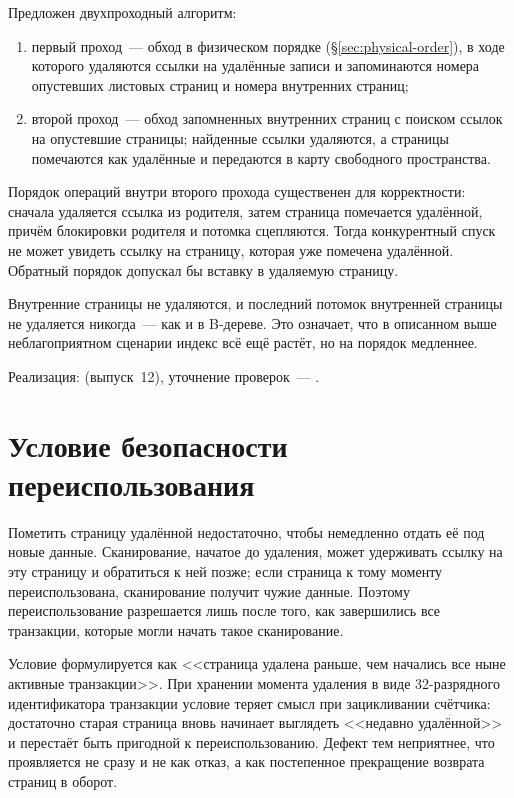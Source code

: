 Предложен двухпроходный алгоритм:

\begin{enumerate}
\item первый проход~--- обход в физическом порядке (§\ref{sec:physical-order}),
      в ходе которого удаляются ссылки на удалённые записи и запоминаются номера
      опустевших листовых страниц и номера внутренних страниц;
\item второй проход~--- обход запомненных внутренних страниц с поиском ссылок
      на опустевшие страницы; найденные ссылки удаляются, а страницы
      помечаются как удалённые и передаются в карту свободного пространства.
\end{enumerate}

Порядок операций внутри второго прохода существенен для корректности: сначала
удаляется ссылка из родителя, затем страница помечается удалённой, причём
блокировки родителя и потомка сцепляются. Тогда конкурентный спуск не может
увидеть ссылку на страницу, которая уже помечена удалённой. Обратный порядок
допускал бы вставку в удаляемую страницу.

Внутренние страницы не удаляются, и последний потомок внутренней страницы не
удаляется никогда~--- как и в B-дереве. Это означает, что в описанном выше
неблагоприятном сценарии индекс всё ещё растёт, но на порядок медленнее.

Реализация: 
(выпуск~12), уточнение проверок~--- .

\section{Условие безопасности переиспользования}
\label{sec:64bit-xid}

Пометить страницу удалённой недостаточно, чтобы немедленно отдать её под новые
данные. Сканирование, начатое до удаления, может удерживать ссылку на эту
страницу и обратиться к ней позже; если страница к тому моменту переиспользована,
сканирование получит чужие данные. Поэтому переиспользование разрешается лишь
после того, как завершились все транзакции, которые могли начать такое
сканирование.

Условие формулируется как <<страница удалена раньше, чем начались все ныне
активные транзакции>>. При хранении момента удаления в виде 32-разрядного
идентификатора транзакции условие теряет смысл при зацикливании счётчика:
достаточно старая страница вновь начинает выглядеть <<недавно удалённой>> и
перестаёт быть пригодной к переиспользованию. Дефект тем неприятнее, что
проявляется не сразу и не как отказ, а как постепенное прекращение возврата
страниц в оборот.

